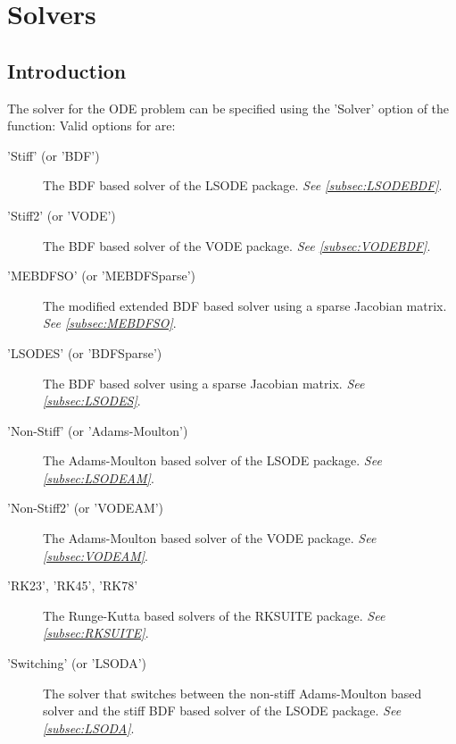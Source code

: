 \chapter{Solvers} \label{ch:Solvers}
\section{Introduction}
The solver for the ODE problem can be specified using the 'Solver' option of the  function:
Valid options for  are:
\begin{description}
 \item['Stiff' (or 'BDF')] The BDF based solver of the LSODE package. \emph{See \ref{subsec:LSODEBDF}}.
 \item['Stiff2' (or 'VODE')] The BDF based solver of the VODE package. \emph{See \ref{subsec:VODEBDF}}.
 \item['MEBDFSO' (or 'MEBDFSparse')] The modified extended BDF based solver using a sparse Jacobian matrix. \emph{See \ref{subsec:MEBDFSO}}.
 \item['LSODES' (or 'BDFSparse')] The BDF based solver using a sparse Jacobian matrix. \emph{See \ref{subsec:LSODES}}.
 \item['Non-Stiff' (or 'Adams-Moulton')] The Adams-Moulton based solver of the LSODE package. \emph{See \ref{subsec:LSODEAM}}.
 \item['Non-Stiff2' (or 'VODEAM')] The Adams-Moulton based solver of the VODE package. \emph{See \ref{subsec:VODEAM}}.
 \item['RK23', 'RK45', 'RK78'] The Runge-Kutta based solvers of the RKSUITE package. \emph{See \ref{subsec:RKSUITE}}.
 \item['Switching' (or 'LSODA')] The solver that switches between the non-stiff Adams-Moulton based solver and the stiff BDF based solver of the LSODE package. \emph{See \ref{subsec:LSODA}}.
\end{description}

